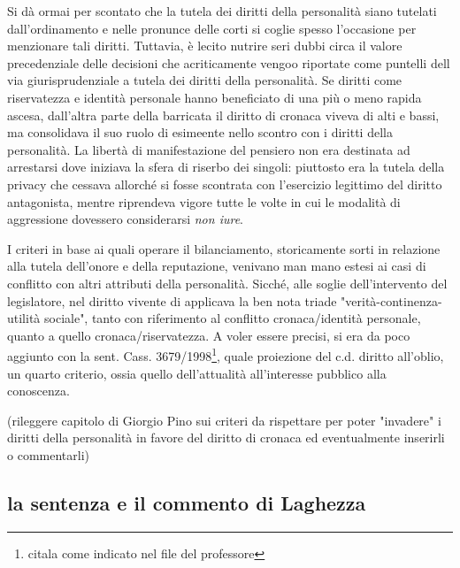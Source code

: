 Si dà ormai per scontato che la tutela dei diritti della personalità siano tutelati dall'ordinamento e nelle pronunce delle corti si coglie spesso  l'occasione per menzionare tali diritti. Tuttavia, è lecito nutrire seri dubbi circa il valore precedenziale delle decisioni che acriticamente vengoo riportate come puntelli dell via giurisprudenziale a tutela dei diritti della personalità.
Se diritti come riservatezza e identità personale hanno beneficiato di una più o meno rapida ascesa, dall'altra parte della barricata il diritto di cronaca viveva di alti e bassi, ma consolidava il suo ruolo di esimeente nello scontro con i diritti della personalità.
La libertà di manifestazione del pensiero non era destinata ad arrestarsi dove iniziava la sfera di riserbo dei singoli: piuttosto era la tutela della privacy che cessava allorché si fosse scontrata con l'esercizio legittimo del diritto antagonista, mentre riprendeva vigore tutte le volte in cui le modalità di aggressione dovessero considerarsi \textit{non iure}.

I criteri in base ai quali operare il bilanciamento, storicamente sorti in relazione alla tutela dell'onore e della reputazione, venivano man mano estesi ai casi di conflitto con altri attributi della personalità. Sicché, alle soglie dell'intervento del legislatore, nel diritto vivente di applicava la ben nota triade "verità-continenza-utilità sociale", tanto con riferimento al conflitto cronaca/identità personale, quanto a quello cronaca/riservatezza.
A voler essere precisi, si era da poco aggiunto con la sent. Cass. 3679/1998\footnote{citala come indicato nel file del professore}, quale proiezione del c.d. diritto all'oblio, un quarto criterio, ossia quello dell'attualità all'interesse pubblico alla conoscenza.


(rileggere capitolo di Giorgio Pino sui criteri da rispettare per poter "invadere" i diritti della personalità in favore del diritto di cronaca ed eventualmente inserirli o commentarli)

\subsection{la sentenza e il commento di Laghezza}

